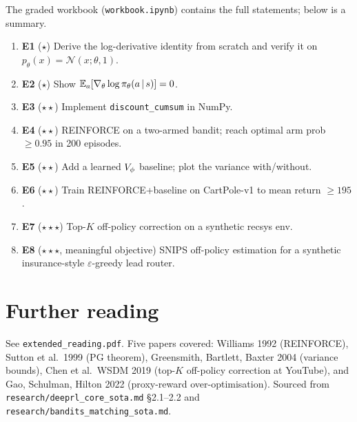 \documentclass[11pt,oneside]{scrbook}
\begin{document}
The graded workbook (\texttt{workbook.ipynb}) contains the full statements; below is a summary.

\begin{enumerate}[label={},leftmargin=0pt,labelsep=0pt]
  \item \textbf{E1} ($\star$) Derive the log-derivative identity from scratch and verify it on $p_\theta(x) = \mathcal{N}(x;\theta,1)$.
  \item \textbf{E2} ($\star$) Show $\mathbb{E}_{a}[\nabla_\theta \log \pi_\theta(a\,\vert\, s)] = 0$.
  \item \textbf{E3} ($\star\star$) Implement \texttt{discount\_cumsum} in NumPy.
  \item \textbf{E4} ($\star\star$) REINFORCE on a two-armed bandit; reach optimal arm prob $\ge 0.95$ in 200 episodes.
  \item \textbf{E5} ($\star\star$) Add a learned $V_\phi$ baseline; plot the variance with/without.
  \item \textbf{E6} ($\star\star$) Train REINFORCE+baseline on CartPole-v1 to mean return $\ge 195$.
  \item \textbf{E7} ($\star\star\star$) Top-$K$ off-policy correction on a synthetic recsys env.
  \item \textbf{E8} ($\star\star\star$, meaningful objective) SNIPS off-policy estimation for a synthetic insurance-style $\varepsilon$-greedy lead router.
\end{enumerate}

\chapter{Further reading}

See \texttt{extended\_reading.pdf}. Five papers covered: Williams 1992 (REINFORCE), Sutton et al.\ 1999 (PG theorem), Greensmith, Bartlett, Baxter 2004 (variance bounds), Chen et al.\ WSDM 2019 (top-$K$ off-policy correction at YouTube), and Gao, Schulman, Hilton 2022 (proxy-reward over-optimisation). Sourced from \texttt{research/deeprl\_core\_sota.md} \S 2.1--2.2 and \texttt{research/bandits\_matching\_sota.md}.
\end{document}
